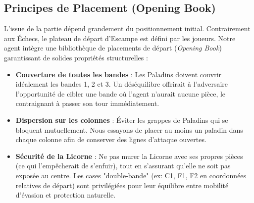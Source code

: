 \documentclass[12pt,a4paper]{article}
\begin{document}
\subsection{Principes de Placement (Opening Book)}
L'issue de la partie dépend grandement du positionnement initial. Contrairement aux Échecs, le plateau de départ d'Escampe est défini par les joueurs. Notre agent intègre une bibliothèque de placements de départ (\textit{Opening Book}) garantissant de solides propriétés structurelles :
\begin{itemize}
    \item \textbf{Couverture de toutes les bandes} : Les Paladins doivent couvrir idéalement les bandes 1, 2 et 3. Un déséquilibre offrirait à l'adversaire l'opportunité de cibler une bande où l'agent n'aurait aucune pièce, le contraignant à passer son tour immédiatement.
    \item \textbf{Dispersion sur les colonnes} : Éviter les grappes de Paladins qui se bloquent mutuellement. Nous essayons de placer au moins un paladin dans chaque colonne afin de conserver des lignes d'attaque ouvertes.
    \item \textbf{Sécurité de la Licorne} : Ne pas murer la Licorne avec ses propres pièces (ce qui l'empêcherait de s'enfuir), tout en s'assurant qu'elle ne soit pas exposée au centre. Les cases "double-bande" (ex: C1, F1, F2 en coordonnées relatives de départ) sont privilégiées pour leur équilibre entre mobilité d'évasion et protection naturelle.
\end{itemize}
\end{document}
